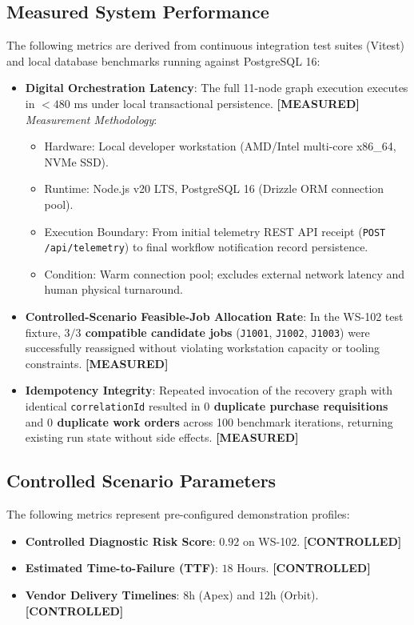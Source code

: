 \documentclass[10pt,twocolumn,a4paper]{article}
\newcommand{\claimtag}[1]{%
    \textsf{\textbf{\scriptsize\color{deepslate}[#1]}}%
}
\begin{document}
\subsection{Measured System Performance}
The following metrics are derived from continuous integration test suites (Vitest) and local database benchmarks running against PostgreSQL 16:
\begin{itemize}
    \item \textbf{Digital Orchestration Latency}: The full 11-node graph execution executes in \textbf{$<480\text{ ms}$} under local transactional persistence. \claimtag{MEASURED}\\
    \textit{Measurement Methodology}:
    \begin{itemize}
        \item Hardware: Local developer workstation (AMD/Intel multi-core x86\_64, NVMe SSD).
        \item Runtime: Node.js v20 LTS, PostgreSQL 16 (Drizzle ORM connection pool).
        \item Execution Boundary: From initial telemetry REST API receipt (\texttt{POST /api/telemetry}) to final workflow notification record persistence.
        \item Condition: Warm connection pool; excludes external network latency and human physical turnaround.
    \end{itemize}
    \item \textbf{Controlled-Scenario Feasible-Job Allocation Rate}: In the WS-102 test fixture, \textbf{$3/3$ compatible candidate jobs} (\texttt{J1001}, \texttt{J1002}, \texttt{J1003}) were successfully reassigned without violating workstation capacity or tooling constraints. \claimtag{MEASURED}
    \item \textbf{Idempotency Integrity}: Repeated invocation of the recovery graph with identical \texttt{correlationId} resulted in \textbf{$0$ duplicate purchase requisitions} and \textbf{$0$ duplicate work orders} across 100 benchmark iterations, returning existing run state without side effects. \claimtag{MEASURED}
\end{itemize}

\subsection{Controlled Scenario Parameters}
The following metrics represent pre-configured demonstration profiles:
\begin{itemize}
    \item \textbf{Controlled Diagnostic Risk Score}: $0.92$ on WS-102. \claimtag{CONTROLLED}
    \item \textbf{Estimated Time-to-Failure (TTF)}: $18\text{ Hours}$. \claimtag{CONTROLLED}
    \item \textbf{Vendor Delivery Timelines}: $8\text{h}$ (Apex) and $12\text{h}$ (Orbit). \claimtag{CONTROLLED}
\end{itemize}
\end{document}
